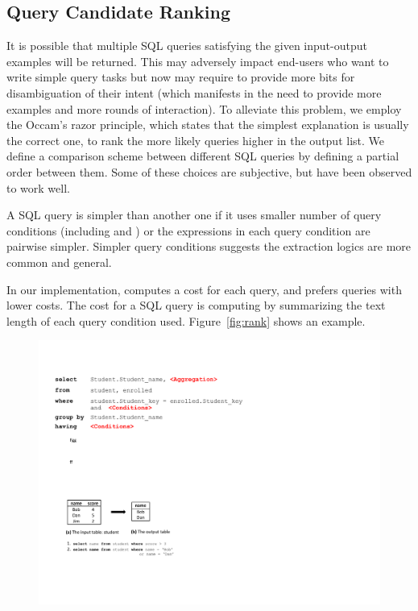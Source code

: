 \subsection{Query Candidate Ranking}
\label{sec:ranking}


It is possible that multiple SQL queries satisfying
the given input-output examples will be returned.
This may adversely impact end-users who want to
write simple query tasks but now may require
to provide more bits for disambiguation of their intent (which
manifests in the need to provide more examples and more rounds
of interaction). To alleviate this problem, we employ
the Occam's razor principle, which states that the
simplest explanation is usually the correct one, to
rank the more likely queries higher in the output list.
We define a comparison scheme between different
SQL queries by defining a partial order between them. Some of
these choices are subjective, but have been observed to work well.

A SQL query is simpler than another one if it uses
smaller number of query conditions (including 
and ) or the expressions
in each query condition are pairwise simpler.
Simpler query conditions suggests the extraction logics
are more common and general.

In our implementation, \ourtool computes a cost for each
query, and prefers queries with lower costs. The cost
for a SQL query is computing by summarizing the text length
of each query condition used. Figure~\ref{fig:rank} shows an example.


\begin{figure}[t]
\centering
 \includegraphics[scale=0.80]{rankexample}
 \vspace{-3mm}
\end{figure}

